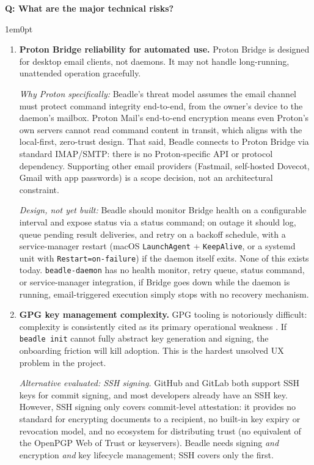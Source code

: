 \documentclass[11pt,letterpaper]{article}
\newcounter{faqnum}
\newenvironment{faqpair}[1]{%
  \needspace{4\baselineskip}%
  \vspace{0.5em}%
  \refstepcounter{faqnum}%
  \noindent\textbf{\color{SectionBlue}Q\thefaqnum: #1}\par\nopagebreak[4]%
  \vspace{0.2em}%
  \begin{adjustwidth}{1em}{0pt}%
  \setlength{\parindent}{0pt}%
}{%
  \end{adjustwidth}%
  \vspace{0.5em}%
}
\begin{document}
\begin{faqpair}{What are the major technical risks?}\label{faq:tech-risks}
  \begin{enumerate}[nosep]
    \item \textbf{Proton Bridge reliability for automated use.} Proton Bridge
      is designed for desktop email clients, not daemons. It may not handle
      long-running, unattended operation gracefully.

      \textit{Why Proton specifically:} Beadle's threat model assumes the
      email channel must protect command integrity end-to-end, from the
      owner's device to the daemon's mailbox. Proton Mail's end-to-end
      encryption means even Proton's own servers cannot read command content in
      transit, which aligns with the local-first, zero-trust design. That said,
      Beadle connects to Proton Bridge via standard IMAP/SMTP: there is no
      Proton-specific API or protocol dependency. Supporting other email
      providers (Fastmail, self-hosted Dovecot, Gmail with app passwords) is a
      scope decision, not an architectural constraint.

      \textit{Design, not yet built:} Beadle should monitor Bridge health on
      a configurable interval and expose status via a status command; on
      outage it should log, queue pending result deliveries, and retry on a
      backoff schedule, with a service-manager restart (macOS
      {\small\texttt{LaunchAgent}} + {\small\texttt{KeepAlive}}, or a systemd
      unit with {\small\texttt{Restart=on-failure}}) if the daemon itself
      exits. None of this exists today. \texttt{beadle-daemon} has no
      health monitor, retry queue, status command, or service-manager
      integration, if Bridge goes down while the daemon is running,
      email-triggered execution simply stops with no recovery mechanism.
    \item \textbf{GPG key management complexity.} GPG tooling is notoriously
      difficult: complexity is consistently cited as its primary operational
      weakness \cite{hoopdotdev2024gpg}. If {\small\texttt{beadle init}} cannot
      fully abstract key generation and signing, the onboarding friction will
      kill adoption. This is the hardest unsolved UX problem in the project.

      \textit{Alternative evaluated: SSH signing.} GitHub and GitLab both
      support SSH keys for commit signing, and most developers already have an
      SSH key. However, SSH signing only covers commit-level attestation:
      it provides no standard for encrypting documents to a recipient, no
      built-in key expiry or revocation model, and no ecosystem for
      distributing trust (no equivalent of the OpenPGP Web of Trust or
      keyservers). Beadle needs signing \textit{and} encryption \textit{and}
      key lifecycle management; SSH covers only the first.


\end{enumerate}
\end{faqpair}
\end{document}
